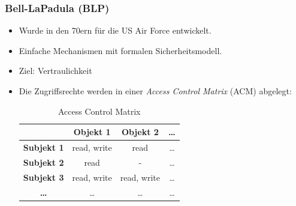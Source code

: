 \documentclass[a4paper, 11pt, accentcolor = tud3b]{tudreport}
\begin{document}
                \subsubsection{Bell-LaPadula (BLP)}
                    \begin{itemize}
                    	\item Wurde in den 70ern für die US Air Force entwickelt.
                    	\item Einfache Mechanismen mit formalen Sicherheitsmodell.
                    	\item Ziel: Vertraulichkeit
                    	\item Die Zugriffsrechte werden in einer \textit{Access Control Matrix} (ACM) abgelegt:
	                    	\begin{table}[H]
	                    		\centering
	                    		\begin{tabular}{| c | c | c | c |}
	                    			\hline
	                    			                   & \textbf{Objekt 1} & \textbf{Objekt 2} & \textbf{\dots} \\ \hline
	                    			\textbf{Subjekt 1} & read, write       & read              & \dots          \\ \hline
	                    			\textbf{Subjekt 2} & read              & -                 & \dots          \\ \hline
	                    			\textbf{Subjekt 3} & read, write       & read, write       & \dots          \\ \hline
	                    			\textbf{\dots}     & \dots             & \dots             & \dots          \\ \hline
	                    		\end{tabular}
	                    		\caption{Access Control Matrix}
	                    	\end{table}
                    \end{itemize}
                
\end{document}
